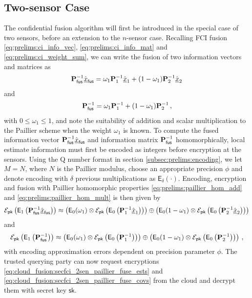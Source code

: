 \subsection{Two-sensor Case}\label{subsec:cloud_fusion:secfci_2sen}
The confidential fusion algorithm will first be introduced in the special case of two sensors, before an extension to the $n$-sensor case. Recalling FCI fusion \eqref{eq:prelims:ci_info_vec}, \eqref{eq:prelims:ci_info_mat} and \eqref{eq:prelims:ci_weight_sum}, we can write the fusion of two information vectors and matrices as
\begin{equation}
    {\ensuremath{{\mathbf{P}}}}_{\mathsf{fus}}^{-1}\hat{{\underline{x}}}_{\mathsf{fus}} = \omega_1{{\mathbf{P}}}_1^{-1}\hat{{\underline{x}}}_1 + (1 - \omega_1){{\mathbf{P}}}_2^{-1}\hat{{\underline{x}}}_2
\end{equation}
and
\begin{equation}
    {\ensuremath{{\mathbf{P}}}}_{\mathsf{fus}}^{-1} = \omega_1{{\mathbf{P}}}_1^{-1} + (1 - \omega_1){{\mathbf{P}}}_2^{-1}\,,
\end{equation}
with $0\leq \omega_1\leq 1$, and note the suitability of addition and scalar multiplication to the Paillier scheme when the weight $\omega_1$ is known. To compute the fused information vector ${{\mathbf{P}}}_{\mathsf{fus}}^{-1}\hat{{\underline{x}}}_{\mathsf{fus}}$ and information matrix ${{\mathbf{P}}}_{\mathsf{fus}}^{-1}$ homomorphically, local estimate information must first be encoded as integers before encryption at the sensors. Using the Q number format in section \ref{subsec:prelims:encoding}, we let $M=N$, where $N$ is the Paillier modulus, choose an appropriate precision $\phi$ and denote encoding with $\delta$ previous multiplications as $\mathsf{E}_{\delta}(\cdot)$. Encoding, encryption and fusion with Paillier homomorphic properties \eqref{eq:prelims:paillier_hom_add} and \eqref{eq:prelims:paillier_hom_mult} is then given by
\begin{equation}\label{eq:cloud_fusion:secfci_2sen_paillier_fuse_ests}
    \mathcal{E}_{\mathsf{pk}}\left(\mathsf{E}_1\left({{\mathbf{P}}}_{\mathsf{fus}}^{-1}\hat{{\underline{x}}}_{\mathsf{fus}}\right)\right) \approx \left(\mathsf{E}_0(\omega_1)\otimes\mathcal{E}_{\mathsf{pk}}\left(\mathsf{E}_0\left({{\mathbf{P}}}^{-1}_1\hat{{\underline{x}}}_1\right)\right)\right)\oplus\left(\mathsf{E}_0(1 - \omega_1)\otimes\mathcal{E}_{\mathsf{pk}}\left(\mathsf{E}_0\left({{\mathbf{P}}}^{-1}_2\hat{{\underline{x}}}_2\right)\right)\right)
\end{equation}
and
\begin{equation}\label{eq:cloud_fusion:secfci_2sen_paillier_fuse_covs}
    \mathcal{E}_{\mathsf{pk}}\left(\mathsf{E}_1\left({{\mathbf{P}}}_{\mathsf{fus}}^{-1}\right)\right) \approx \left(\mathsf{E}_0(\omega_1)\otimes\mathcal{E}_{\mathsf{pk}}\left(\mathsf{E}_0\left({{\mathbf{P}}}^{-1}_1\right)\right)\right)\oplus\left(\mathsf{E}_0(1 -\omega_1)\otimes\mathcal{E}_{\mathsf{pk}}\left(\mathsf{E}_0\left({{\mathbf{P}}}^{-1}_2\right)\right)\right)\,,
\end{equation}
with encoding approximation errors dependent on precision parameter $\phi$. The trusted querying party can now request encryptions \eqref{eq:cloud_fusion:secfci_2sen_paillier_fuse_ests} and \eqref{eq:cloud_fusion:secfci_2sen_paillier_fuse_covs} from the cloud and decrypt them with secret key $\mathsf{sk}$.


